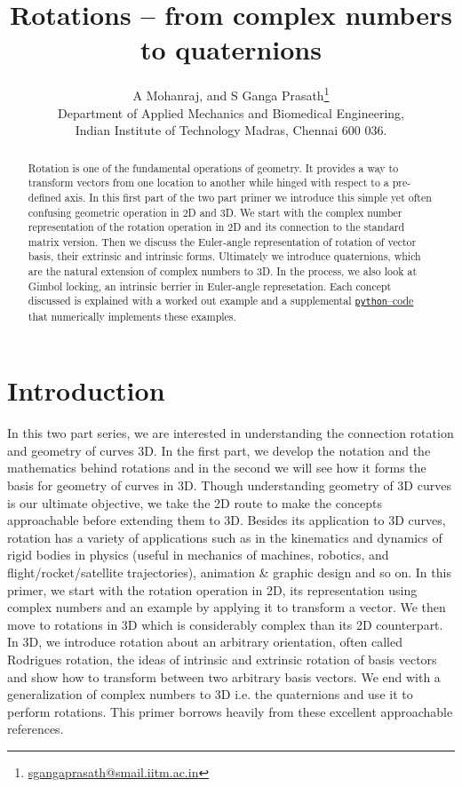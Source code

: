 \documentclass{article}
\title{Rotations -- from complex numbers to quaternions}
\author{A Mohanraj, and S Ganga Prasath\footnote{\href{emailto:sgangaprasath@smail.iitm.ac.in}{sgangaprasath@smail.iitm.ac.in}} \\
Department of Applied Mechanics and Biomedical Engineering,\\
Indian Institute of Technology Madras, Chennai 600 036.}
\date{}
\begin{document}
\maketitle
\begin{abstract}
Rotation is one of the fundamental operations of geometry. It provides a way to transform vectors from one location to another while hinged with respect to a pre-defined axis. In this first part of the two part primer we introduce this simple yet often confusing geometric operation in 2D and 3D. We start with the complex number representation of the rotation operation in 2D and its connection to the standard matrix version. Then we discuss the Euler-angle representation of rotation of vector basis, their extrinsic and intrinsic forms. Ultimately we introduce quaternions, which are the natural extension of complex numbers to 3D. In the process, we also look at Gimbol locking, an intrinsic berrier in Euler-angle represetation. Each concept discussed is explained with a worked out example and a supplemental \href{https://github.com/sgangaprasath/RotationTut/blob/main/Rotations.ipynb}{\texttt{python}--code} that numerically implements these examples.
\end{abstract}


\section{Introduction}
In this two part series, we are interested in understanding the connection rotation and geometry of curves 3D. In the first part, we develop the notation and the mathematics behind rotations and in the second we will see how it forms the basis for geometry of curves in 3D. Though understanding geometry of 3D curves is our ultimate objective, we take the 2D route to make the concepts approachable before extending them to 3D. Besides its application to 3D curves, rotation has a variety of applications such as in the kinematics and dynamics of rigid bodies in physics (useful in mechanics of machines, robotics, and flight/rocket/satellite trajectories), animation \& graphic design and so on. In this primer, we start with the rotation operation in 2D, its representation using complex numbers and an example by applying it to transform a vector. We then move to rotations in 3D which is considerably complex than its 2D counterpart. In 3D, we introduce rotation about an arbitrary orientation, often called Rodrigues rotation, the ideas of intrinsic and extrinsic rotation of basis vectors and show how to transform between two arbitrary basis vectors. We end with a generalization of complex numbers to 3D i.e. the quaternions and use it to perform rotations. This primer borrows heavily from these \cite{hanson2005visualizing,vince2008geometric,vince2006mathematics} excellent approachable references.
\end{document}
